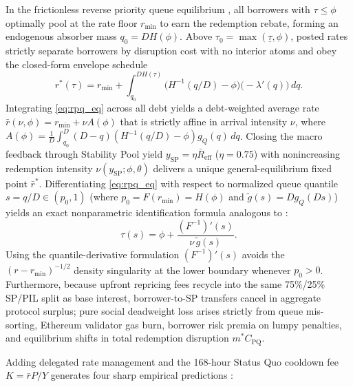 In the frictionless reverse priority queue equilibrium \citep{companion2026,milgrom2002envelope}, all borrowers with $\tau \le \phi$ optimally pool at the rate floor $r_{\min}$ to earn the redemption rebate, forming an endogenous absorber mass $q_0 = D H(\phi)$. Above $\tau_0 = \max(\underline{\tau}, \phi)$, posted rates strictly separate borrowers by disruption cost with no interior atoms and obey the closed-form envelope schedule
\begin{equation}\label{eq:rpq_eq}
r^*(\tau) = r_{\min} + \int_{q_0}^{D H(\tau)} \bigl(H^{-1}(q/D) - \phi\bigr)\bigl(-\lambda'(q)\bigr)\,dq.
\end{equation}
Integrating \eqref{eq:rpq_eq} across all debt yields a debt-weighted average rate $\bar{r}(\nu, \phi) = r_{\min} + \nu A(\phi)$ that is strictly affine in arrival intensity $\nu$, where $A(\phi) = \frac{1}{D}\int_{q_0}^D (D - q)(H^{-1}(q/D) - \phi)g_Q(q)\,dq$. Closing the macro feedback through Stability Pool yield $y_{\text{SP}} = \eta \bar{R}_{\text{eff}}$ ($\eta = 0.75$) with nonincreasing redemption intensity $\nu(y_{\text{SP}}; \phi, \theta)$ delivers a unique general-equilibrium fixed point $\bar{r}^*$. Differentiating \eqref{eq:rpq_eq} with respect to normalized queue quantile $s = q/D \in (p_0, 1)$ (where $p_0 = F(r_{\min}) = H(\phi)$ and $\tilde{g}(s) = D g_Q(D s)$) yields an exact nonparametric identification formula analogous to \citet{guerre2000optimal}:
\begin{equation}\label{eq:gpv_inv}
\tau(s) = \phi + \frac{(F^{-1})'(s)}{\nu\,\tilde{g}(s)}.
\end{equation}
Using the quantile-derivative formulation $(F^{-1})'(s)$ avoids the $(r - r_{\min})^{-1/2}$ density singularity at the lower boundary whenever $p_0 > 0$. Furthermore, because upfront repricing fees recycle into the same 75\%/25\% SP/PIL split as base interest, borrower-to-SP transfers cancel in aggregate protocol surplus; pure social deadweight loss arises strictly from queue mis-sorting, Ethereum validator gas burn, borrower risk premia on lumpy penalties, and equilibrium shifts in total redemption disruption $m^* C_{\text{PQ}}$.

Adding delegated rate management and the 168-hour Status Quo cooldown fee $K = \bar{r} P / Y$ generates four sharp empirical predictions \citep{companion2026}:

